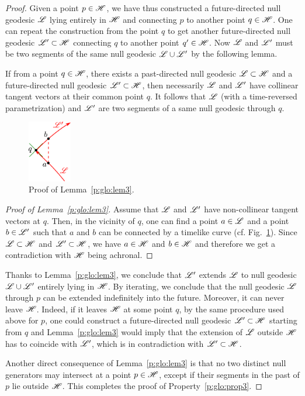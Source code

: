 \begin{proof}
Given a point $p\in\mathscr{H}$, we have thus constructed a
future-directed null geodesic $\mathscr{L}$ lying entirely in $\mathscr{H}$ and
connecting $p$ to another point $q\in\mathscr{H}$. One can
repeat the construction
from the point $q$ to get another future-directed null geodesic $\mathscr{L}'\subset\mathscr{H}$
connecting $q$ to another point $q'\in\mathscr{H}$. Now $\mathscr{L}$ and $\mathscr{L}'$ must
be two segments of the same null geodesic $\mathscr{L}\cup\mathscr{L}'$ by the following lemma.
\begin{lemma}
\label{p:glo:lem3}
If from a point $q\in\mathscr{H}$, there exists a past-directed
null geodesic $\mathscr{L}\subset\mathscr{H}$ and a future-directed null geodesic $\mathscr{L}'\subset\mathscr{H}$,
then necessarily $\mathscr{L}$ and $\mathscr{L}'$ have collinear tangent vectors at their common point $q$.
It follows that $\mathscr{L}$ (with a time-reversed parametrization) and $\mathscr{L}'$ are two segments
of a same null geodesic through $q$.
\end{lemma}
\begin{figure}
\centerline{\includegraphics[width=0.17\textwidth]{glo_unique_geod.pdf}}
\caption[]{\label{f:glo:unique_geod} \footnotesize
Proof of Lemma~\ref{p:glo:lem3}.}
\end{figure}
\begin{proof}[Proof of Lemma~\ref{p:glo:lem3}]
Assume that $\mathscr{L}$ and $\mathscr{L}'$ have non-collinear tangent vectors at $q$. Then, in
the vicinity of $q$, one can find a point $a\in\mathscr{L}$ and a point $b\in\mathscr{L}'$
such that $a$ and $b$ can be connected by a timelike curve (cf.
Fig.~\ref{f:glo:unique_geod}). Since $\mathscr{L}\subset\mathscr{H}$ and $\mathscr{L}'\subset\mathscr{H}$, we have $a\in\mathscr{H}$ and
$b\in\mathscr{H}$ and therefore we get a contradiction with $\mathscr{H}$ being achronal.
\end{proof}
Thanks to Lemma~\ref{p:glo:lem3}, we conclude that $\mathscr{L}'$ extends $\mathscr{L}$ to null geodesic
$\mathscr{L}\cup\mathscr{L}'$ entirely lying in $\mathscr{H}$. By iterating, we conclude that
the null geodesic $\mathscr{L}$ through $p$ can be extended indefinitely into the
future. Moreover, it can never leave $\mathscr{H}$. Indeed, if it leaves $\mathscr{H}$ at
some point $q$, by the same procedure used above for $p$, one could construct a future-directed null geodesic
$\mathscr{L}'\subset\mathscr{H}$ starting from $q$ and Lemma~\ref{p:glo:lem3} would imply that
the extension of $\mathscr{L}$ outside $\mathscr{H}$ has to coincide with $\mathscr{L}'$, which is
in contradiction with $\mathscr{L}'\subset\mathscr{H}$.

Another direct consequence of Lemma~\ref{p:glo:lem3} is that no two distinct null generators
may intersect at a point $p\in\mathscr{H}$, except if their segments in the past of
$p$ lie outside $\mathscr{H}$.
This completes the proof of Property~\ref{p:glo:prop3}.
\end{proof}


